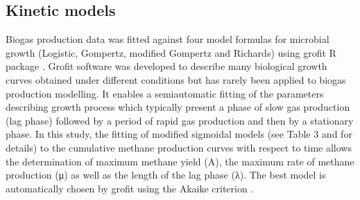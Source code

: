\subsection{Kinetic models}
Biogas production data was fitted against four model formulas for microbial growth (Logistic, Gompertz, modified Gompertz and Richards) using grofit R package \cite{Kahm_2010}. Grofit software was developed to describe many biological growth curves obtained under different conditions but has rarely been applied to biogas production modelling. It enables a semiautomatic fitting of the parameters describing  growth process which typically present a phase of slow gas production (lag phase) followed by a period of rapid gas production and then by a stationary phase. In this study, the fitting of modified sigmoidal models (see Table 3 and \cite{Zwietering1990} for details) to the cumulative methane production curves  with respect to time allows the determination of maximum methane yield (A), the maximum rate of methane production (μ) as well as the length of the lag phase (λ). The best model is automatically chosen by grofit using the Akaike criterion \cite{Hasenbrink_2006}.